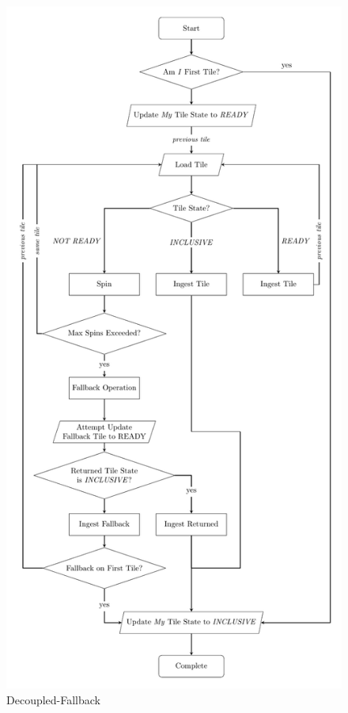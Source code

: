 \documentclass[sigconf]{acmart}
\begin{document}
\begin{figure}[h]
  \centering
  \includegraphics[width=\linewidth]{graphics/FlowChart.pdf}
  \caption{Decoupled-Fallback}
\end{figure}
\end{document}

